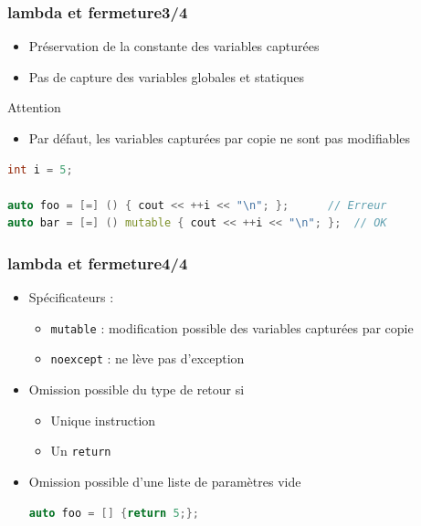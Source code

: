 \documentclass[C++.tex]{subfiles}
\begin{document}
\begin{frame}[fragile]
	\frametitle{lambda et fermeture\titlehfill{}3/4}
	\begin{itemize}
		\item Préservation de la constante des variables capturées


		\item Pas de capture des variables globales et statiques

	\end{itemize}

	\begin{alertblock}{Attention}
		\begin{itemize}
			\item Par défaut, les variables capturées par copie ne sont pas modifiables
		\end{itemize}
	
		\begin{lstlisting}[language=C++]
int i = 5;
	
auto foo = [=] () { cout << ++i << "\n"; };      // Erreur
auto bar = [=] () mutable { cout << ++i << "\n"; };  // OK\end{lstlisting}
	
	\end{alertblock}
\end{frame}

\begin{frame}[fragile]
	\frametitle{lambda et fermeture\titlehfill{}4/4}
	\begin{itemize}
		\item Spécificateurs :
		\begin{itemize}
			\item \lstinline|mutable| : modification possible des variables capturées par copie
			\item \lstinline|noexcept| : ne lève pas d'exception
		\end{itemize}

		\item Omission possible du type de retour si
		\begin{itemize}
			\item Unique instruction
			\item Un \lstinline|return|
		\end{itemize}
	
	
		\item Omission possible d'une liste de paramètres vide


\begin{lstlisting}[language=C++]
auto foo = [] {return 5;};\end{lstlisting}
	\end{itemize}
\end{frame}
\end{document}
